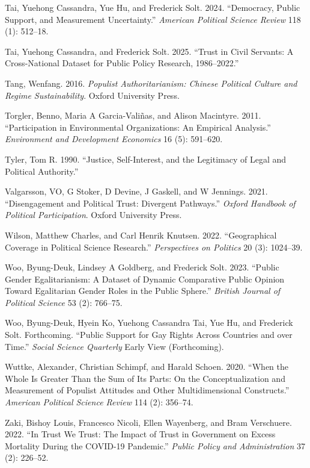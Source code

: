 \documentclass[
  12pt,
]{article}
\newlength{\cslhangindent}
\newenvironment{CSLReferences}[2] %
 {\begin{list}{}{%
  \setlength{\itemindent}{0pt}
  \setlength{\leftmargin}{0pt}
  \setlength{\parsep}{0pt}
  \ifodd #1
   \setlength{\leftmargin}{\cslhangindent}
   \setlength{\itemindent}{-1\cslhangindent}
  \fi
  \setlength{\itemsep}{#2\baselineskip}}}
 {\end{list}}
\begin{document}
\begin{CSLReferences}{1}{0}
Tai, Yuehong Cassandra, Yue Hu, and Frederick Solt. 2024. {``Democracy, Public Support, and Measurement Uncertainty.''} \emph{American Political Science Review} 118 (1): 512--18.

Tai, Yuehong Cassandra, and Frederick Solt. 2025. {``Trust in Civil Servants: A Cross-National Dataset for Public Policy Research, 1986--2022.''}

Tang, Wenfang. 2016. \emph{Populist Authoritarianism: Chinese Political Culture and Regime Sustainability}. Oxford University Press.

Torgler, Benno, Maria A Garcia-Valiñas, and Alison Macintyre. 2011. {``Participation in Environmental Organizations: An Empirical Analysis.''} \emph{Environment and Development Economics} 16 (5): 591--620.

Tyler, Tom R. 1990. {``Justice, Self-Interest, and the Legitimacy of Legal and Political Authority.''}

Valgarsson, VO, G Stoker, D Devine, J Gaskell, and W Jennings. 2021. {``Disengagement and Political Trust: Divergent Pathways.''} \emph{Oxford Handbook of Political Participation}. Oxford University Press.

Wilson, Matthew Charles, and Carl Henrik Knutsen. 2022. {``Geographical Coverage in Political Science Research.''} \emph{Perspectives on Politics} 20 (3): 1024--39.

Woo, Byung-Deuk, Lindsey A Goldberg, and Frederick Solt. 2023. {``Public Gender Egalitarianism: A Dataset of Dynamic Comparative Public Opinion Toward Egalitarian Gender Roles in the Public Sphere.''} \emph{British Journal of Political Science} 53 (2): 766--75.

Woo, Byung-Deuk, Hyein Ko, Yuehong Cassandra Tai, Yue Hu, and Frederick Solt. Forthcoming. {``Public Support for Gay Rights Across Countries and over Time.''} \emph{Social Science Quarterly} Early View (Forthcoming).

Wuttke, Alexander, Christian Schimpf, and Harald Schoen. 2020. {``When the Whole Is Greater Than the Sum of Its Parts: On the Conceptualization and Measurement of Populist Attitudes and Other Multidimensional Constructs.''} \emph{American Political Science Review} 114 (2): 356--74.

Zaki, Bishoy Louis, Francesco Nicoli, Ellen Wayenberg, and Bram Verschuere. 2022. {``In Trust We Trust: The Impact of Trust in Government on Excess Mortality During the COVID-19 Pandemic.''} \emph{Public Policy and Administration} 37 (2): 226--52.

\end{CSLReferences}
\end{document}
